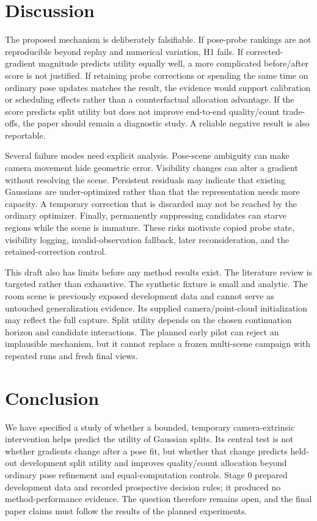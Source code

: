 \documentclass[10pt]{article}
\begin{document}
\section{Discussion}

The proposed mechanism is deliberately falsifiable. If pose-probe rankings
are not reproducible beyond replay and numerical variation, H1 fails. If
corrected-gradient magnitude predicts utility equally well, a more complicated
before/after score is not justified. If retaining probe corrections or
spending the same time on ordinary pose updates matches the result, the
evidence would support calibration or scheduling effects rather than a
counterfactual allocation advantage. If the score predicts split utility but
does not improve end-to-end quality/count trade-offs, the paper should remain
a diagnostic study. A reliable negative result is also reportable.

Several failure modes need explicit analysis. Pose-scene ambiguity can make
camera movement hide geometric error. Visibility changes can alter a gradient
without resolving the scene. Persistent residuals may indicate that existing
Gaussians are under-optimized rather than that the representation needs more
capacity. A temporary correction that is discarded may not be reached by the
ordinary optimizer. Finally, permanently suppressing candidates can starve
regions while the scene is immature. These risks motivate copied probe state,
visibility logging, invalid-observation fallback, later reconsideration, and
the retained-correction control.

This draft also has limits before any method results exist. The literature
review is targeted rather than exhaustive. The synthetic fixture is small and
analytic. The room scene is previously exposed development data and cannot
serve as untouched generalization evidence. Its supplied camera/point-cloud
initialization may reflect the full capture. Split utility depends on the
chosen continuation horizon and candidate interactions. The planned early
pilot can reject an implausible mechanism, but it cannot replace a frozen
multi-scene campaign with repeated runs and fresh final views.

\section{Conclusion}

We have specified a study of whether a bounded, temporary camera-extrinsic
intervention helps predict the utility of Gaussian splits. Its central test is
not whether gradients change after a pose fit, but whether that change
predicts held-out development split utility and improves quality/count
allocation beyond ordinary pose refinement and equal-computation controls.
Stage 0 prepared development data and recorded prospective decision rules;
it produced no method-performance evidence. The question therefore remains
open, and the final paper claims must follow the results of the planned
experiments.
\end{document}
